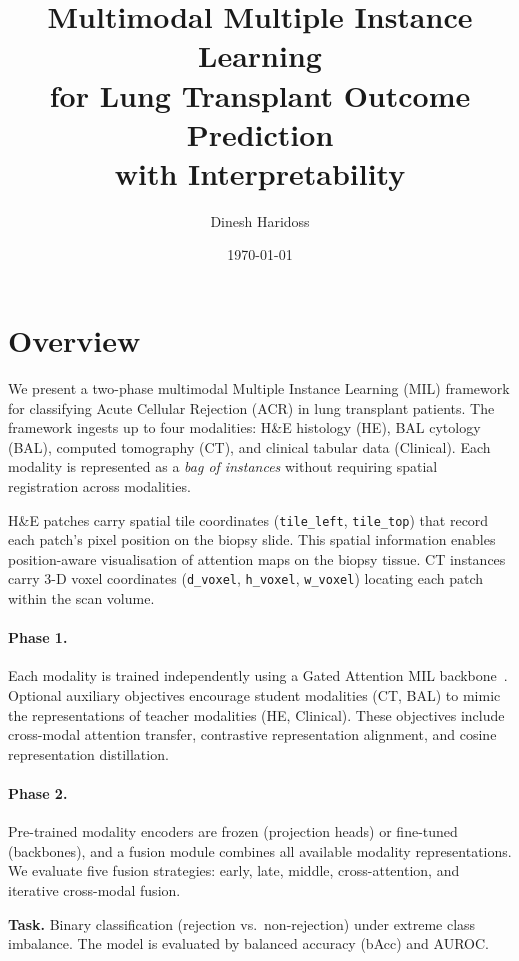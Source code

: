 \documentclass[11pt,a4paper]{article}
\title{\textbf{Multimodal Multiple Instance Learning\\
for Lung Transplant Outcome Prediction\\
with Interpretability}}
\author{Dinesh Haridoss}
\date{\today}
\begin{document}
\maketitle
\tableofcontents
\newpage

\section{Overview}

We present a two-phase multimodal Multiple Instance Learning (MIL) framework for
classifying Acute Cellular Rejection (ACR) in lung transplant patients.
The framework ingests up to four modalities: H\&E histology (HE), BAL cytology
(BAL), computed tomography (CT), and clinical tabular data (Clinical).
Each modality is represented as a \emph{bag of instances} without requiring
spatial registration across modalities.

H\&E patches carry spatial tile coordinates (\texttt{tile\_left},
\texttt{tile\_top}) that record each patch's pixel position on the biopsy slide.
This spatial information enables position-aware visualisation of attention maps
on the biopsy tissue.
CT instances carry 3-D voxel coordinates (\texttt{d\_voxel}, \texttt{h\_voxel},
\texttt{w\_voxel}) locating each patch within the scan volume.

\paragraph{Phase 1.}
Each modality is trained independently using a Gated Attention MIL
backbone~\cite{ilse2018abmil}.
Optional auxiliary objectives encourage student modalities (CT, BAL) to mimic
the representations of teacher modalities (HE, Clinical).
These objectives include cross-modal attention transfer, contrastive
representation alignment, and cosine representation distillation.

\paragraph{Phase 2.}
Pre-trained modality encoders are frozen (projection heads) or fine-tuned
(backbones), and a fusion module combines all available modality representations.
We evaluate five fusion strategies: early, late, middle, cross-attention, and
iterative cross-modal fusion.

\bigskip\noindent
\textbf{Task.}
Binary classification (rejection vs.\ non-rejection) under extreme class
imbalance.
The model is evaluated by balanced accuracy (bAcc) and AUROC.
\end{document}
